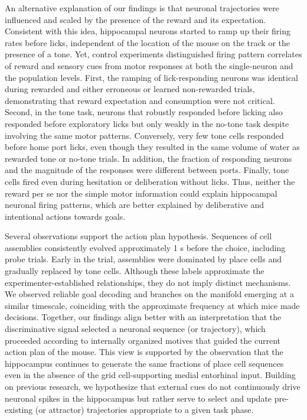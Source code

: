 An alternative explanation of our findings is that neuronal trajectories were influenced and scaled by the presence of the reward and its expectation. Consistent with this idea, hippocampal neurons started to ramp up their firing rates before licks, independent of the location of the mouse on the track or the presence of a tone. Yet, control experiments distinguished firing pattern correlates of reward and sensory cues from motor responses at both the single-neuron and the population levels. First, the ramping of lick-responding neurons was identical during rewarded and either erroneous or learned non-rewarded trials, demonstrating that reward expectation and consumption were not critical. Second, in the tone task, neurons that robustly responded before licking also responded before exploratory licks but only weakly in the no-tone task despite involving the same motor patterns. Conversely, very few tone cells responded before home port licks, even though they resulted in the same volume of water as rewarded tone or no-tone trials. In addition, the fraction of responding neurons and the magnitude of the responses were different between ports. Finally, tone cells fired even during hesitation or deliberation without licks. Thus, neither the reward per se nor the simple motor information could explain hippocampal neuronal firing patterns, which are better explained by deliberative and intentional actions towards goals.

Several observations support the action plan hypothesis. Sequences of cell assemblies consistently evolved approximately 1 s before the choice, including probe trials. Early in the trial, assemblies were dominated by place cells and gradually replaced by tone cells. Although these labels approximate the experimenter-established relationships, they do not imply distinct mechanisms. We observed reliable goal decoding and branches on the manifold emerging at a similar timescale, coinciding with the approximate frequency at which mice made decisions. Together, our findings align better with an interpretation that the discriminative signal selected a neuronal sequence (or trajectory), which proceeded according to internally organized motives that guided the current action plan of the mouse. This view is supported by the observation that the hippocampus continues to generate the same fractions of place cell sequences even in the absence of the grid cell-supporting medial entorhinal input. Building on previous research, we hypothesize that external cues do not continuously drive neuronal spikes in the hippocampus but rather serve to select and update pre-existing (or attractor) trajectories appropriate to a given task phase.

